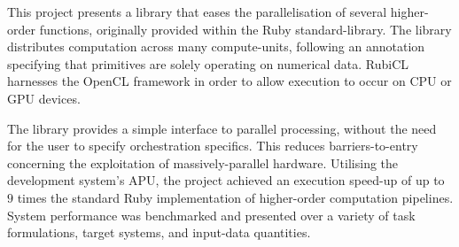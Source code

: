 This project presents a library that eases the parallelisation of several higher-order functions, originally provided within the Ruby standard-library.
The library distributes computation across many compute-units, following an annotation specifying that primitives are solely operating on numerical data. RubiCL harnesses the OpenCL framework in order to allow execution to occur on CPU or GPU devices.

The library provides a simple interface to parallel processing, without the need for the user to specify orchestration specifics. This reduces barriers-to-entry concerning the exploitation of massively-parallel hardware. Utilising the development system's APU, the project achieved an execution speed-up of up to $9$ times the standard Ruby implementation of higher-order computation pipelines. System performance was benchmarked and presented over a variety of task formulations, target systems, and input-data quantities.
